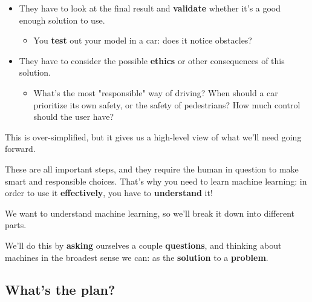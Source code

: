 \begin{itemize}
            \item They have to look at the final result and \textbf{validate} whether it's a good enough solution to use.
            
                \begin{itemize}
                    \item \miniex You \textbf{test} out your model in a car: does it notice obstacles?
                \end{itemize}
            
            \item They have to consider the possible \textbf{ethics} or other consequences of this solution.
            
                \begin{itemize}
                    \item \miniex What's the most "responsible" way of driving? When should a car prioritize its own safety, or the safety of pedestrians? How much control should the user have?
                \end{itemize}
            
        \end{itemize}
        
        This is over-simplified, but it gives us a high-level view of what we'll need going forward.
        
        These are all important steps, and they require the human in question to make smart and responsible choices. That's why you need to learn machine learning: in order to use it \textbf{effectively}, you have to \textbf{understand} it!
    
\pagebreak  

        


    We want to understand machine learning, so we'll break it down into different parts. 
    
    We'll do this by \textbf{asking} ourselves a couple \textbf{questions}, and thinking about machines in the broadest sense we can: as the \textbf{solution} to a \textbf{problem}.
    
    \subsection{What's the plan?}
    
